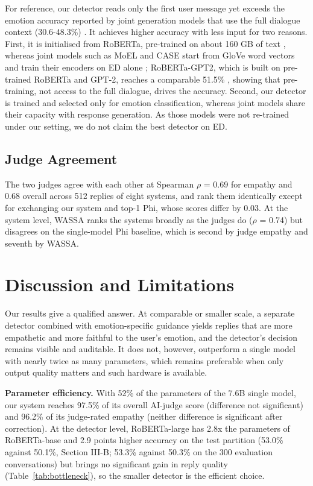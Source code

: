\documentclass[conference,a4paper]{IEEEtran}
\begin{document}
For reference, our detector reads only the first user message yet exceeds the emotion accuracy reported by joint generation models that use the full dialogue context (30.6-48.3\%) \cite{b2,b12,b33}. It achieves higher accuracy with less input for two reasons. First, it is initialised from RoBERTa, pre-trained on about 160 GB of text \cite{b20}, whereas joint models such as MoEL and CASE start from GloVe word vectors and train their encoders on ED alone \cite{b5,b7}; RoBERTa-GPT2, which is built on pre-trained RoBERTa and GPT-2, reaches a comparable 51.5\% \cite{b34}, showing that pre-training, not access to the full dialogue, drives the accuracy. Second, our detector is trained and selected only for emotion classification, whereas joint models share their capacity with response generation. As those models were not re-trained under our setting, we do not claim the best detector on ED.


\subsection{Judge Agreement}
The two judges agree with each other at Spearman $\rho$ = 0.69 for empathy and 0.68 overall across 512 replies of eight systems, and rank them identically except for exchanging our system and top-1 Phi, whose scores differ by 0.03. At the system level, WASSA ranks the systems broadly as the judges do ($\rho$ = 0.74) but disagrees on the single-model Phi baseline, which is second by judge empathy and seventh by WASSA.


\section{Discussion and Limitations}
Our results give a qualified answer. At comparable or smaller scale, a separate detector combined with emotion-specific guidance yields replies that are more empathetic and more faithful to the user's emotion, and the detector's decision remains visible and auditable. It does not, however, outperform a single model with nearly twice as many parameters, which remains preferable when only output quality matters and such hardware is available.

\textbf{Parameter efficiency.} With 52\% of the parameters of the 7.6B single model, our system reaches 97.5\% of its overall AI-judge score (difference not significant) and 96.2\% of its judge-rated empathy (neither difference is significant after correction). At the detector level, RoBERTa-large has 2.8x the parameters of RoBERTa-base and 2.9 points higher accuracy on the test partition (53.0\% against 50.1\%, Section III-B; 53.3\% against 50.3\% on the 300 evaluation conversations) but brings no significant gain in reply quality (Table~\ref{tab:bottleneck}), so the smaller detector is the efficient choice.
\end{document}
